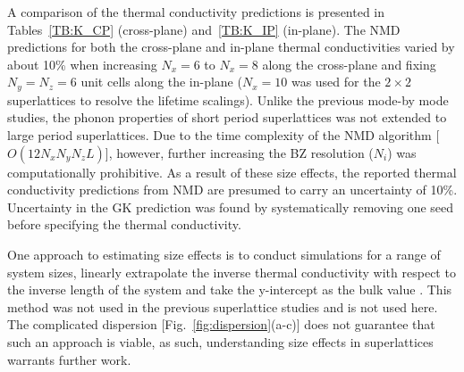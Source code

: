 A comparison of the thermal conductivity predictions is presented in Tables~\ref{TB:K_CP} (cross-plane) and~\ref{TB:K_IP} (in-plane). The NMD predictions for both the cross-plane and in-plane thermal conductivities varied by about 10\% when increasing $N_x=6$ to $N_x=8$ along the cross-plane and fixing $N_y=N_z=6$ unit cells along the in-plane ($N_x=10$ was used for the $2\times2$ superlattices to resolve the lifetime scalings). Unlike the previous mode-by mode studies, the phonon properties of short period superlattices was not extended to large period superlattices. Due to the time complexity of the NMD algorithm [$O(12N_xN_yN_z L)$], however, further increasing the BZ resolution ($N_i$) was computationally prohibitive. As a result of these size effects, the reported thermal conductivity predictions from NMD are presumed to carry an uncertainty of 10\%. Uncertainty in the GK prediction was found by systematically removing one seed before specifying the thermal conductivity.

One approach to estimating size effects is to conduct simulations for a range of system sizes, linearly extrapolate the inverse thermal conductivity with respect to the inverse length of the system and take the y-intercept as the bulk value \cite{PhysRevB.81.214305}.  %
This method was not used in the previous superlattice studies \cite{doi:10.1021/nl202186y,savic:073113,Luckyanova16112012} and is not used here. The complicated dispersion [Fig.~\ref{fig:dispersion}(a-c)] does not guarantee that such an approach is viable, as such, understanding size effects in superlattices warrants further work.

